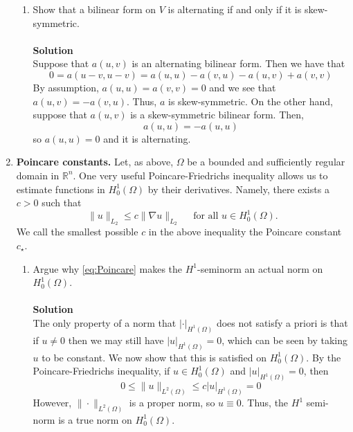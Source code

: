 \documentclass[11pt]{article}
\begin{document}
\begin{enumerate}
\begin{enumerate}


  \item Show that a bilinear form on $V$ is alternating if and only if
    it is skew-symmetric.\\
\\

{\bf Solution}\\
Suppose that $a(u,v)$ is an alternating bilinear form.  Then we have that 
\[
0 = a(u-v, u-v) = a(u,u) - a(v,u) - a(u,v) + a(v,v)
\]
By assumption, $a(u,u) = a(v,v) = 0$ and we see that $a(u,v) = -a(v,u)$.  Thus, $a$ is skew-symmetric.  On the other hand, suppose that $a(u,v)$ is a skew-symmetric bilinear form.  Then,
\[
a(u,u) = -a(u,u)
\]
so $a(u,u) = 0$ and it is alternating.




  \end{enumerate}
\item {\bf Poincare constants.}  Let, as above, $\Omega$ be a bounded
  and sufficiently regular domain in $\mathbb R^n$.  One very
  useful Poincare-Friedrichs inequality allows us to estimate
  functions in $H_0^1(\Omega)$ by their derivatives. Namely, there
  exists a $c>0$ such that
  \begin{equation}\label{eq:Poincare}
    \|u\|_{L_2} \le c \|\nabla u\|_{L_2} \quad \text{ for all } u\in
    H_0^1(\Omega).
  \end{equation}
  We call the smallest possible $c$ in the above inequality the
  Poincare constant $c_\star$.
  \begin{enumerate}
  \item Argue why \eqref{eq:Poincare} makes the $H^1$-seminorm an
    actual norm on $H_0^1(\Omega)$.\\
\\


{\bf Solution}\\
The only property of a norm that $|\cdot |_{H^1(\Omega)}$ does not satisfy a priori is that if $u \neq 0$ then we may still have $|u|_{H^1(\Omega)} = 0$, which can be seen by taking $u$ to be constant.  We now show that this is satisfied on $H_0^1(\Omega)$.  By the Poincare-Friedrichs inequality, if $u\in H_0^1(\Omega)$ and $|u|_{H^1(\Omega)} = 0$, then
\[
0 \le \|u\|_{L^2(\Omega)} \le c |u|_{H^1(\Omega)} = 0
\]
However, $\|\cdot \|_{L^2(\Omega)}$ is a proper norm, so $u \equiv 0$.  Thus, the $H^1$ semi-norm is a true norm on $H_0^1(\Omega)$.



\end{enumerate}
\end{enumerate}
\end{document}
